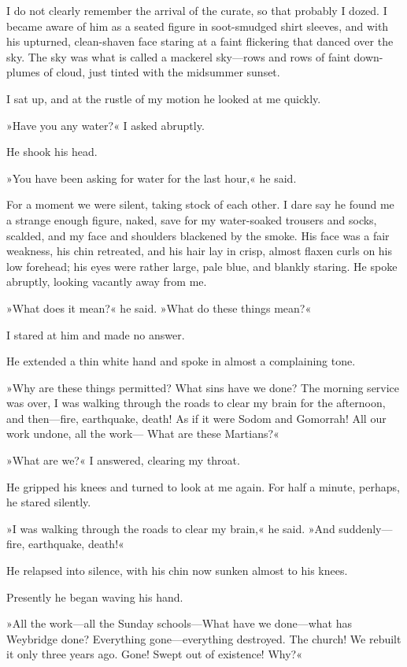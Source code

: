 I do not clearly remember the arrival of the curate, so that probably I dozed. I became aware of him as a seated figure in soot-smudged shirt sleeves, and with his upturned, clean-shaven face staring at a faint flickering that danced over the sky. The sky was what is called a mackerel sky—rows and rows of faint down-plumes of cloud, just tinted with the midsummer sunset.

I sat up, and at the rustle of my motion he looked at me quickly.

»Have you any water?« I asked abruptly.

He shook his head.

»You have been asking for water for the last hour,« he said.

For a moment we were silent, taking stock of each other. I dare say he found me a strange enough figure, naked, save for my water-soaked trousers and socks, scalded, and my face and shoulders blackened by the smoke. His face was a fair weakness, his chin retreated, and his hair lay in crisp, almost flaxen curls on his low forehead; his eyes were rather large, pale blue, and blankly staring. He spoke abruptly, looking vacantly away from me.

»What does it mean?« he said. »What do these things mean?«

I stared at him and made no answer.

He extended a thin white hand and spoke in almost a complaining tone.

»Why are these things permitted? What sins have we done? The morning service was over, I was walking through the roads to clear my brain for the afternoon, and then—fire, earthquake, death! As if it were Sodom and Gomorrah! All our work undone, all the work— What are these Martians?«

»What are we?« I answered, clearing my throat.

He gripped his knees and turned to look at me again. For half a minute, perhaps, he stared silently.

»I was walking through the roads to clear my brain,« he said. »And suddenly—fire, earthquake, death!«

He relapsed into silence, with his chin now sunken almost to his knees.

Presently he began waving his hand.

»All the work—all the Sunday schools—What have we done—what has Weybridge done? Everything gone—everything destroyed. The church! We rebuilt it only three years ago. Gone! Swept out of existence! Why?«

